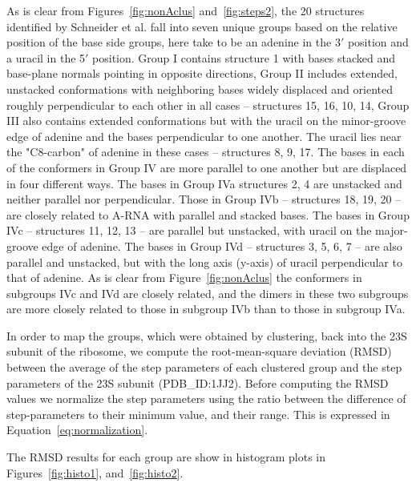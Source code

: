 As is clear  from Figures~\ref{fig:nonAclus} and~\ref{fig:steps2}, the
20 structures  identified by Schneider  et al. fall into  seven unique
groups based  on the relative position  of the base  side groups, here
take to be  an adenine in the  3$'$ position and a uracil  in the 5$'$
position.   Group I  contains  structure {1}  with  bases stacked  and
base-plane normals pointing in  opposite directions, Group II includes
extended,  unstacked  conformations   with  neighboring  bases  widely
displaced  and oriented  roughly perpendicular  to each  other  in all
cases -- structures {15, 16, 10, 14}, Group III also contains extended
conformations but with the uracil  on the minor-groove edge of adenine
and the bases  perpendicular to one another. The  uracil lies near the
"C8-carbon" of  adenine in these cases  -- structures {8,  9, 17}. The
bases in each  of the conformers in Group IV are  more parallel to one
another but are displaced in  four different ways.  The bases in Group
IVa  structures  {2,  4}   are  unstacked  and  neither  parallel  nor
perpendicular.  Those in  Group IVb -- structures {18,  19, 20} -- are
closely related to A-RNA with parallel and stacked bases. The bases in
Group IVc  -- structures {11, 12,  13} -- are  parallel but unstacked,
with uracil on  the major-groove edge of adenine.   The bases in Group
IVd -- structures {3, 5, 6, 7} -- are also parallel and unstacked, but
with  the  long axis  (y-axis)  of  uracil  perpendicular to  that  of
adenine.  As is clear from Figure~\ref{fig:nonAclus} the conformers in
subgroups IVc and IVd are closely related, and the dimers in these two
subgroups are more closely related to  those in subgroup  IVb than to
those in subgroup IVa.

In order  to map the groups,  which were obtained  by clustering, back
into the 23S subunit of  the ribosome, we compute the root-mean-square
deviation (RMSD)  between the average  of the step parameters  of each
clustered  group  and  the  step   parameters  of  the   23S  subunit
(PDB\_ID:1JJ2).   Before computing  the RMSD  values we  normalize the
step  parameters  using  the   ratio  between  the  difference  of
step-parameters to their minimum value, and their range.  This is
expressed in Equation~\ref{eq:normalization}.

The  RMSD  results for  each  group are  show  in  histogram plots  in
Figures~\ref{fig:histo1}, and~\ref{fig:histo2}.

